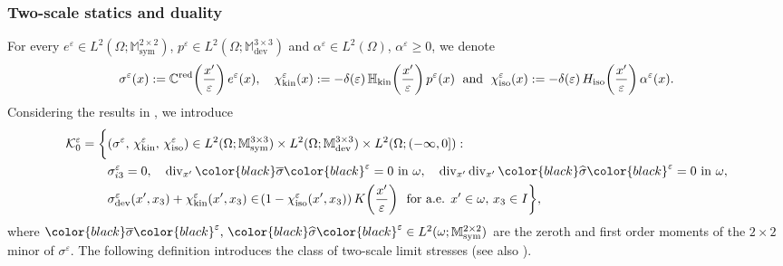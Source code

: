 \documentclass[reqno,10pt]{amsart}
\numberwithin{equation}{section}
\theoremstyle{remark}
\newcommand{\RED}{\color{black}}
\newcommand{\BLACK}{\color{black}}
\newcommand{\C}{\mathbb{C}}
\newcommand{\calK}{\mathcal{K}}
\newcommand{\M}{\mathbb{M}}
\DeclareMathOperator{\dev}{dev}
\DeclareMathOperator{\sym}{sym}
\renewcommand{\div}{\operatorname{div}}
\newcommand{\eps}{\varepsilon}
\newcommand{\zerothI}[1]{\overline{#1}}
\newcommand{\firstI}[1]{\widehat{#1}}
\newcommand{\Hkin}{\mathbb{H}_{\rm kin}}
\newcommand{\Hiso}{H_{\rm iso}}
\newcommand{\chikin}{\chi_{\rm kin}}
\newcommand{\chiiso}{\chi_{\rm iso}}
\newcommand{\red}[1]{#1^{\rm red}}
\begin{document}
\subsubsection{Two-scale statics and duality} \label{section two-scale statics and duality} 
For every $e^\eps \in L^2(\Omega;\M^{2 \times 2}_{\sym})$, $p^\eps \in L^2(\Omega;\M^{3 \times 3}_{\dev})$ and $\alpha^\eps \in L^2(\Omega)$, $\alpha^\eps \geq 0$, we denote 
\begin{equation*}
	\sigma^\eps(x) := \red{\C}\!\left(\frac{x'}{\eps}\right) e^\eps(x),
	\quad \chikin^\eps(x) := - \delta(\eps)\,\Hkin\!\left(\frac{x'}{\eps}\right) p^\eps(x)
	\;\text{ and }\; \chiiso^\eps(x) := - \delta(\eps)\,\Hiso\!\left(\frac{x'}{\eps}\right) \alpha^\eps(x).
\end{equation*}
Considering the results in , we introduce
\begin{align*}
	\calK^\eps_{0} = \bigg\{& (\sigma^\eps,\, \chikin^\eps,\, \chiiso^\eps) \in L^2(\Omega;\M^{3 \times 3}_{\sym}) \times L^2(\Omega;\M^{3 \times 3}_{\dev}) \times L^2(\Omega;(-\infty,0]) : 
	\\& \sigma^\eps_{i3} = 0,\quad \div_{x'}{\RED\zerothI{\sigma}\BLACK}^\eps = 0 \text{ in } \omega,\quad \div_{x'}\div_{x'}{\RED\firstI{\sigma}\BLACK}^\eps = 0 \text{ in } \omega,
	\\& \sigma^\eps_{\dev}(x',x_3)+\chikin^\eps(x',x_3) \in \!\left(1-\chiiso^\eps(x',x_3)\right) K\!\left(\frac{x'}{\eps}\right) \,\text{ for a.e. } x' \in \omega,\, x_3 \in I\bigg\},
\end{align*}
where ${\RED\zerothI{\sigma}\BLACK}^\eps,\, {\RED\firstI{\sigma}\BLACK}^\eps \in L^2(\omega;\M^{2 \times 2}_{\sym})$ are the zeroth and first order moments of the $2 \times 2$ minor of $\sigma^\eps$.
The following definition introduces the class of two-scale limit stresses (see also \cite{Buzancic.Davoli.Velcic.2024.2nd}).
\end{document}
